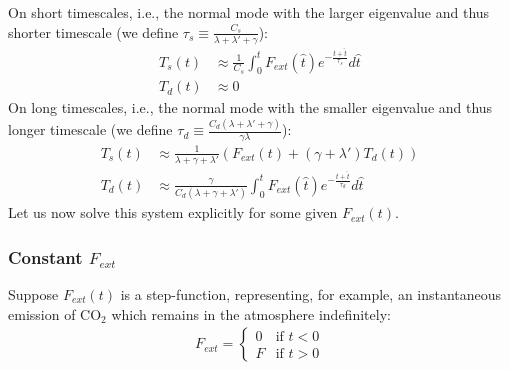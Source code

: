 \noindent On short timescales, i.e., the normal mode with the larger eigenvalue and thus shorter timescale (we define $\tau_s\equiv\frac{C_s}{\lambda+\lambda'+\gamma}$): 
\begin{align}
    T_s(t) & \approx \frac{1}{C_s}\int_0^tF_{ext}(\hat{t}) e^{-\frac{t+\hat{t}}{\tau_s}}d\hat{t} \label{T_s short soln} \\ 
    T_d(t)& \approx 0 \label{T_d short soln}
\end{align}
On long timescales, i.e., the normal mode with the smaller eigenvalue and thus longer timescale (we define $\tau_d\equiv\frac{C_d(\lambda+\lambda'+\gamma)}{\gamma\lambda}$):
\begin{align}
    T_s(t) & \approx \frac{1}{\lambda+\gamma+\lambda'}\left(F_{ext}(t)+(\gamma+\lambda ')T_d(t)\right) \\ 
    T_d(t) & \approx \frac{\gamma}{C_d(\lambda+\gamma+\lambda')}\int_0^tF_{ext}(\hat{t}) e^{-\frac{t+\hat{t}}{\tau_d}}d\hat{t}  \label{T_d long step soln}
\end{align}
Let us now solve this system explicitly for some given $F_{ext}(t)$. 

\subsubsection{Constant \texorpdfstring{$F_{ext}$}{F-ext}}

Suppose $F_{ext}(t)$ is a step-function, representing, for example, an instantaneous emission of CO$_2$ which remains in the atmosphere indefinitely:
\begin{align*}
    F_{ext}=
    \begin{cases}
        0 & \text{if } t<0 \\
        F & \text{if } t>0
    \end{cases}
\end{align*}

